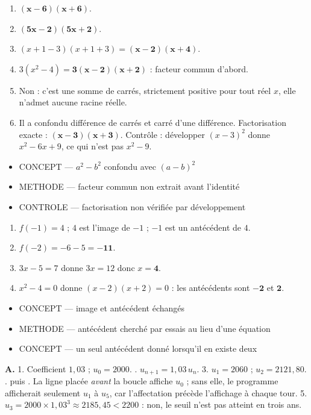 \documentclass[10pt,a4paper]{article}
\begin{document}
\begin{enumerate}
\item $\mathbf{(x-6)(x+6)}$.
\item $\mathbf{(5x-2)(5x+2)}$.
\item $(x+1-3)(x+1+3)=\mathbf{(x-2)(x+4)}$.
\item $3(x^2-4)=\mathbf{3(x-2)(x+2)}$ : facteur commun d'abord.
\item Non : c'est une somme de carrés, strictement positive pour tout réel $x$, elle n'admet aucune racine réelle.
\item Il a confondu différence de carrés et carré d'une différence. Factorisation exacte : $\mathbf{(x-3)(x+3)}$. Contrôle : développer $(x-3)^2$ donne $x^2-6x+9$, ce qui n'est pas $x^2-9$.
\end{enumerate}
\begin{itemize}
\item \textsc{CONCEPT} --- $a^2-b^2$ confondu avec $(a-b)^2$
\item \textsc{METHODE} --- facteur commun non extrait avant l'identité
\item \textsc{CONTROLE} --- factorisation non vérifiée par développement
\end{itemize}
\begin{enumerate}
\item $f(-1)=4$ ; $4$ est l'image de $-1$ ; $-1$ est un antécédent de $4$.
\item $f(-2)=-6-5=\mathbf{-11}$.
\item $3x-5=7$ donne $3x=12$ donc $x=\mathbf{4}$.
\item $x^2-4=0$ donne $(x-2)(x+2)=0$ : les antécédents sont $\mathbf{-2}$ et $\mathbf{2}$.
\end{enumerate}
\begin{itemize}
\item \textsc{CONCEPT} --- image et antécédent échangés
\item \textsc{METHODE} --- antécédent cherché par essais au lieu d'une équation
\item \textsc{CONCEPT} --- un seul antécédent donné lorsqu'il en existe deux
\end{itemize}

\textbf{A.} 1. Coefficient $1{,}03$ ; $u_0=2000$. . $u_{n+1}=1{,}03\,u_n$.
3. $u_1=2060$ ; $u_2=2121{,}80$. .  puis .
La ligne  placée \emph{avant} la boucle affiche $u_0$ ; sans elle, le programme
afficherait seulement $u_1$ à $u_5$, car l'affectation précède l'affichage à chaque tour.
5. $u_3=2000\times 1{,}03^3\approx 2185{,}45 < 2200$ : non, le seuil n'est pas atteint en trois ans.
\end{document}

